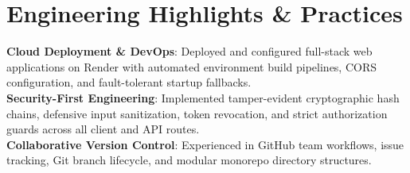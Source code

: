 \documentclass[letterpaper,11pt]{article}
\begin{document}
\section{Engineering Highlights \& Practices}
 \begin{itemize}[leftmargin=0.15in, label={}]
    \small{\item{
     \textbf{Cloud Deployment \& DevOps}{: Deployed and configured full-stack web applications on Render with automated environment build pipelines, CORS configuration, and fault-tolerant startup fallbacks.} \\
     \textbf{Security-First Engineering}{: Implemented tamper-evident cryptographic hash chains, defensive input sanitization, token revocation, and strict authorization guards across all client and API routes.} \\
     \textbf{Collaborative Version Control}{: Experienced in GitHub team workflows, issue tracking, Git branch lifecycle, and modular monorepo directory structures.}
    }}
 \end{itemize}
\end{document}
